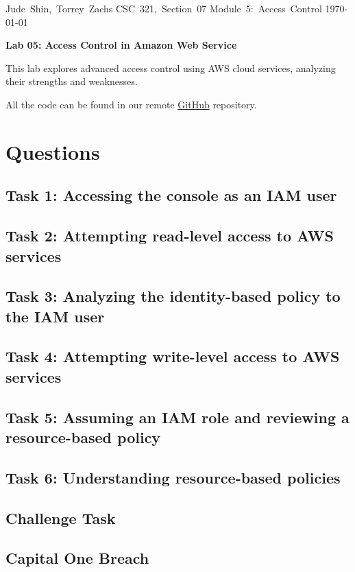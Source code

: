 \documentclass[11pt]{article}
\begin{document}
\hfill\vbox{\hbox{Jude Shin, Torrey Zachs}
		\hbox{CSC 321, Section 07}	
		\hbox{Module 5: Access Control}	
		\hbox{\today}}\par

\bigskip
\centerline{\Large\bf Lab 05: Access Control in Amazon Web Service}\par
\bigskip

This lab explores advanced access control using AWS cloud services, analyzing their strengths and weaknesses. 

All the code can be found in our remote \href{https://github.com/jude-shin/CSC\_321}{GitHub} repository.


\section*{Questions}
\subsection*{Task 1: Accessing the console as an IAM user}
\subsection*{Task 2: Attempting read-level access to AWS services}
\subsection*{Task 3: Analyzing the identity-based policy to the IAM user}
\subsection*{Task 4: Attempting write-level access to AWS services}
\subsection*{Task 5: Assuming an IAM role and reviewing a resource-based policy}
\subsection*{Task 6: Understanding resource-based policies}
\subsection*{Challenge Task}
\subsection*{Capital One Breach}
\end{document}
